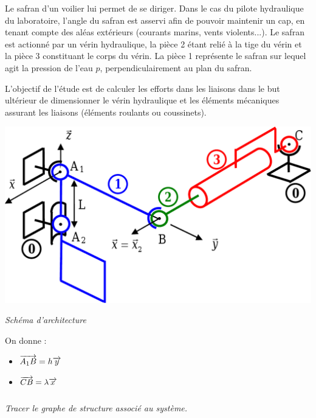 \documentclass[10pt,fleqn]{article} %
\begin{document}

\vspace{7cm}
\pagestyle{fancy}
\thispagestyle{plain}


\def\columnseprulecolor{\color{ocre}}
\setlength{\columnseprule}{0.4pt} 

\begin{multicols}{2}





Le safran d'un voilier lui permet de se diriger. Dans le cas du pilote hydraulique du laboratoire, l'angle du safran est asservi afin de pouvoir maintenir un cap, en tenant compte des aléas extérieurs (courants marins, vents violents...). Le safran est actionné par un vérin hydraulique, la pièce 2 étant relié à la tige du vérin et la pièce 3 constituant le corps du vérin. La pièce 1 représente le safran sur lequel agit la pression de l'eau $p$, perpendiculairement au plan du safran. 

L'objectif de l'étude est de calculer les efforts dans les liaisons dans le but ultérieur de dimensionner le vérin hydraulique et les éléments mécaniques assurant les liaisons (éléments roulants ou coussinets). 

\begin{center}
\includegraphics[width=.9\linewidth]{images/safran2}

\textit{Schéma d'architecture}
\end{center}




On donne : 
\begin{itemize}
\item $\overrightarrow{A_1B}=h\overrightarrow{y}$
\item $\overrightarrow{CB}=\lambda\overrightarrow{x}$
\end{itemize}

\subparagraph{}
\textit{Tracer le graphe de structure associé au système.}


\end{multicols}
\end{document}
